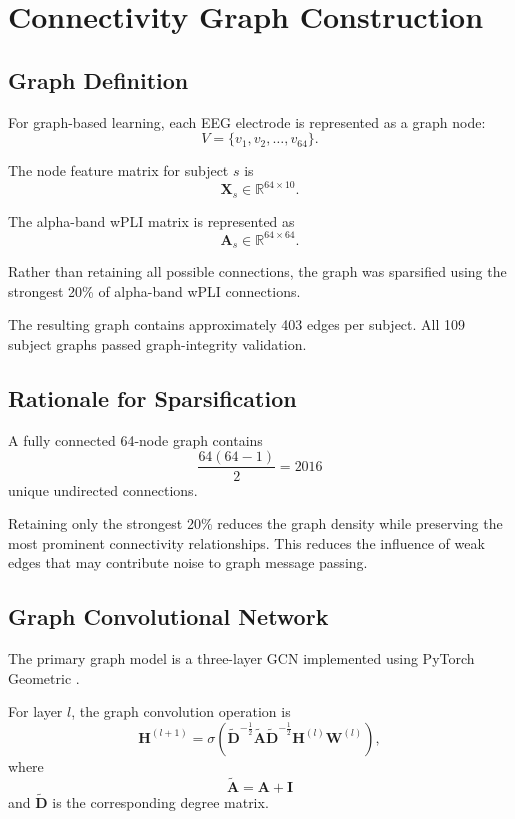 \documentclass[conference]{IEEEtran}
\begin{document}
\section{Connectivity Graph Construction}
\subsection{Graph Definition}
For graph-based learning, each EEG electrode is represented as a graph node:
\begin{equation}
V = \{v_1, v_2, \dots, v_{64}\}.
\end{equation}

The node feature matrix for subject $s$ is
\begin{equation}
\mathbf{X}_s \in \mathbb{R}^{64 \times 10}.
\end{equation}

The alpha-band wPLI matrix is represented as
\begin{equation}
\mathbf{A}_s \in \mathbb{R}^{64 \times 64}.
\end{equation}

Rather than retaining all possible connections, the graph was sparsified using the strongest 20\% of alpha-band wPLI connections.

The resulting graph contains approximately 403 edges per subject. All 109 subject graphs passed graph-integrity validation.

\subsection{Rationale for Sparsification}
A fully connected 64-node graph contains
\begin{equation}
\frac{64(64 - 1)}{2} = 2016
\end{equation}
unique undirected connections.

Retaining only the strongest 20\% reduces the graph density while preserving the most prominent connectivity relationships. This reduces the influence of weak edges that may contribute noise to graph message passing.

\subsection{Graph Convolutional Network}
The primary graph model is a three-layer GCN implemented using PyTorch Geometric \cite{kipf2017}.

For layer $l$, the graph convolution operation is
\begin{equation}
\mathbf{H}^{(l+1)} = \sigma \left( \mathbf{\tilde{D}}^{-\frac{1}{2}} \mathbf{\tilde{A}} \mathbf{\tilde{D}}^{-\frac{1}{2}} \mathbf{H}^{(l)} \mathbf{W}^{(l)} \right),
\end{equation}
where
\begin{equation}
\mathbf{\tilde{A}} = \mathbf{A} + \mathbf{I}
\end{equation}
and $\mathbf{\tilde{D}}$ is the corresponding degree matrix.
\end{document}
